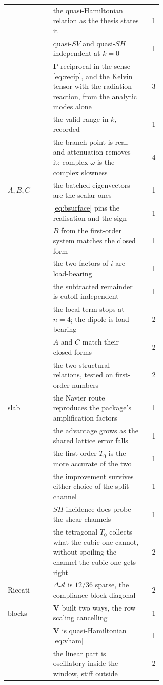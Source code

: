 \documentclass[11pt,a4paper]{article}
\newcommand{\bV}{\mathbf{V}}
\newcommand{\dA}{\Delta\mathcal{A}}
\begin{document}
\begin{longtable}{@{}l>{\raggedright\arraybackslash}p{0.60\linewidth}r@{}}
       & the quasi-Hamiltonian relation as the thesis states it & 1\\
       & quasi-$SV$ and quasi-$SH$ independent at $k=0$ & 1\\
       & $\boldsymbol\Gamma$ reciprocal in the sense \eqref{eq:recip}, and the Kelvin tensor with the
         radiation reaction, from the analytic modes alone & 3\\
       & the valid range in $k$, recorded & 1\\
       & the branch point is real, and attenuation removes it; complex
         $\omega$ is the complex slowness & 4\\
\midrule
$A,B,C$ & the batched eigenvectors are the scalar ones & 1\\
    & \eqref{eq:bsurface} pins the realisation and the sign & 1\\
    & $B$ from the first-order system matches the closed form & 1\\
    & the two factors of $i$ are load-bearing & 1\\
    & the subtracted remainder is cutoff-independent & 1\\
    & the local term stops at $n=4$; the dipole is load-bearing & 2\\
    & $A$ and $C$ match their closed forms & 2\\
    & the two structural relations, tested on first-order numbers & 2\\
\midrule
slab & the Navier route reproduces the package's amplification factors & 1\\
     & the advantage grows as the shared lattice error falls & 1\\
     & the first-order $T_0$ is the more accurate of the two & 1\\
     & the improvement survives either choice of the split channel & 1\\
     & $SH$ incidence does probe the shear channels & 1\\
     & the tetragonal $T_0$ collects what the cubic one cannot, without
       spoiling the channel the cubic one gets right & 2\\
\midrule
Riccati & $\dA$ is $12/36$ sparse, the compliance block diagonal & 2\\
  blocks & $\bV$ built two ways, the row scaling cancelling & 1\\
  & $\bV$ is quasi-Hamiltonian \eqref{eq:vham} & 1\\
  & the linear part is oscillatory inside the window, stiff outside & 2\\

\end{longtable}
\end{document}
